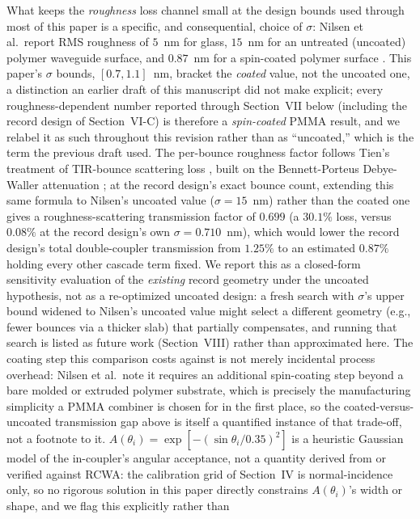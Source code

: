 \documentclass[10pt,twocolumn]{article}
\begin{document}
What keeps the \emph{roughness} loss channel small at the design bounds
used through most of this paper is a specific, and consequential,
choice of $\sigma$: Nilsen et al.\ report RMS roughness of $5$~nm for glass,
$15$~nm for an untreated (uncoated) polymer waveguide surface, and
$0.87$~nm for a spin-coated polymer surface \cite{nilsen2025}. This paper's
$\sigma$ bounds, $[0.7,1.1]$~nm, bracket the \emph{coated} value, not the
uncoated one, a distinction an earlier draft of this manuscript did not
make explicit; every roughness-dependent number reported through
Section~VII below (including the record design of Section~VI-C) is
therefore a \emph{spin-coated} PMMA result, and we relabel it as such
throughout this revision rather than as ``uncoated,'' which is the term
the previous draft used. The per-bounce roughness factor follows Tien's
treatment of TIR-bounce scattering loss \cite{tien1971}, built on the
Bennett-Porteus Debye-Waller attenuation \cite{bennett1961}; at the record
design's exact bounce count, extending this same formula to Nilsen's
uncoated value ($\sigma=15$~nm) rather than the coated one gives a
roughness-scattering transmission factor of $0.699$ (a $30.1\%$ loss,
versus $0.08\%$ at the record design's own $\sigma=0.710$~nm), which would
lower the record design's total double-coupler transmission from $1.25\%$
to an estimated $0.87\%$ holding every other cascade term fixed. We report
this as a closed-form sensitivity evaluation of the \emph{existing} record
geometry under the uncoated hypothesis, not as a re-optimized uncoated
design: a fresh search with $\sigma$'s upper bound widened to Nilsen's
uncoated value might select a different geometry (e.g., fewer bounces via
a thicker slab) that partially compensates, and running that search is
listed as future work (Section~VIII) rather than approximated here. The
coating step this comparison costs against is not merely incidental
process overhead: Nilsen et al.\ note it requires an additional spin-coating
step beyond a bare molded or extruded polymer substrate, which is precisely
the manufacturing simplicity a PMMA combiner is chosen for in the first
place, so the coated-versus-uncoated transmission gap above is itself a
quantified instance of that trade-off, not a footnote to it.
$A(\theta_i) = \exp[-(\sin\theta_i/0.35)^2]$ is a heuristic Gaussian model
of the in-coupler's angular acceptance, not a quantity derived from or
verified against RCWA: the calibration grid of Section~IV is normal-incidence
only, so no rigorous solution in this paper directly constrains
$A(\theta_i)$'s width or shape, and we flag this explicitly rather than
\end{document}
